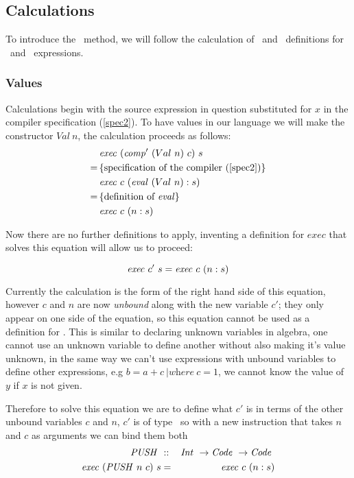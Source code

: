 \documentclass {article}
\begin{document}
\subsection{Calculations}

To introduce the \BH\ method,
we will follow the 
calculation of \comp\ and \exec\ definitions
for \val\ and \add\ expressions\cite[\S2.5]{bandh}.

\subsubsection{Values}

Calculations begin with the source expression in question 
substituted for $x$ in the compiler specification (\ref{spec2}).
To have values in our language we will make the constructor
$Val\ n$, 
the calculation proceeds as follows\cite{bandh}:
\begin{align*}
&\mathit{exec\ } (\mathit{comp'\ } (Val\ n)\ c)\ s \\
=\, & \{ \mbox{specification of the compiler (\ref{spec2})} \} \\
&\mathit{exec\ } c\ (\mathit{eval\ } (Val\ n) : s) \\
=\, & \{ \mbox{definition of \textit{eval}} \} \\
&\mathit{exec\ } c\ (n:s)
\end{align*}

Now there are no further definitions to apply,
inventing a definition for $exec$ that solves this equation
will allow us to proceed:

\[ \mathit{exec\ }  c'\ s = \mathit{exec\ }  c\ (n : s) \]

Currently the calculation is the form of
the right hand side of this equation,
however $c$ and $n$ are now \emph{unbound}
along with the new variable $c'$;
they only appear on one side of the equation,
so this equation cannot be used  as a definition
for \exec.
This is similar to declaring unknown variables 
in algebra, one cannot use an unknown variable to define
another without also making it's value unknown,
in the same way we can't use expressions with
unbound variables to define other expressions,
e.g \(b = a + c\ | \textit{where}\ c = 1\), we cannot
know the value of $y$ if $x$ is not given.

Therefore to solve this equation we are to
define what $c'$ is in terms of 
the other unbound variables $c$ and $n$,
$c'$ is of  type \code\ 
so with a new instruction that takes $n$
and $c$ as arguments we can bind them both\cite[bottom of page 9]{bandh}
\newcommand{\PUSHt}{\textit{PUSH\ }}
\newcommand{\PUSH}{\mathit{PUSH\ }}
\begin{eqnarray}
\PUSH &::& \Int \rightarrow \Code \rightarrow \Code \nonumber \\
\Exec (\PUSH n\ c)\ s &=& \Exec c\ (n :s) \label{execpush}
\end{eqnarray}
\end{document}
